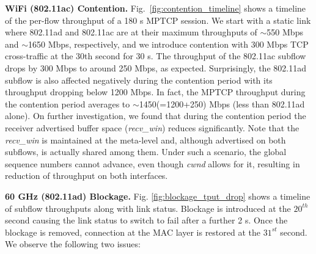 \noindent\textbf{WiFi (802.11ac) Contention. } Fig.~\ref{fig:contention_timeline} shows a timeline of the
per-flow throughput of a 180 s MPTCP session. We start with a static link where 802.11ad and 802.11ac are 
at their maximum throughputs of $\sim$550 Mbps and $\sim$1650 Mbps, respectively, and we introduce
contention with 300 Mbps TCP cross-traffic at the 30th second for 30 s. The throughput of the 
802.11ac subflow drops by 300 Mbps to around 250 Mbps, as expected. Surprisingly, the 802.11ad subflow is also
affected negatively during the contention period with its throughput dropping below 1200 Mbps.
In fact, the MPTCP throughput during the contention period averages to $\sim$1450(=1200+250) Mbps (less than 802.11ad alone). 
On further investigation, we found that during the contention period the receiver advertised buffer space (\emph{recv\_win}) reduces significantly. 
Note that the \emph{recv\_win} is maintained at the meta-level and, although advertised on both subflows, is actually shared 
among them. Under such a scenario, the global sequence numbers
cannot advance, even though \emph{cwnd} allows for it,
resulting in reduction of throughput on both interfaces.

\begin{figure*}[t]
    \centering
    \hfill
    \hfill
    \vspace{-0.15in}
    \caption{\name}
    \vspace{-0.1in}
\end{figure*}
\fi

\noindent\textbf{60 GHz (802.11ad) Blockage. }
Fig. \ref{fig:blockage_tput_drop} shows a timeline of subflow
throughputs along with link status.
Blockage is introduced at the $20^{th}$ second causing the link status to switch to fail after a
further 2 s. Once the blockage is removed, connection at the MAC layer
is restored at the $31^{st}$ second. We observe the following two
issues:

